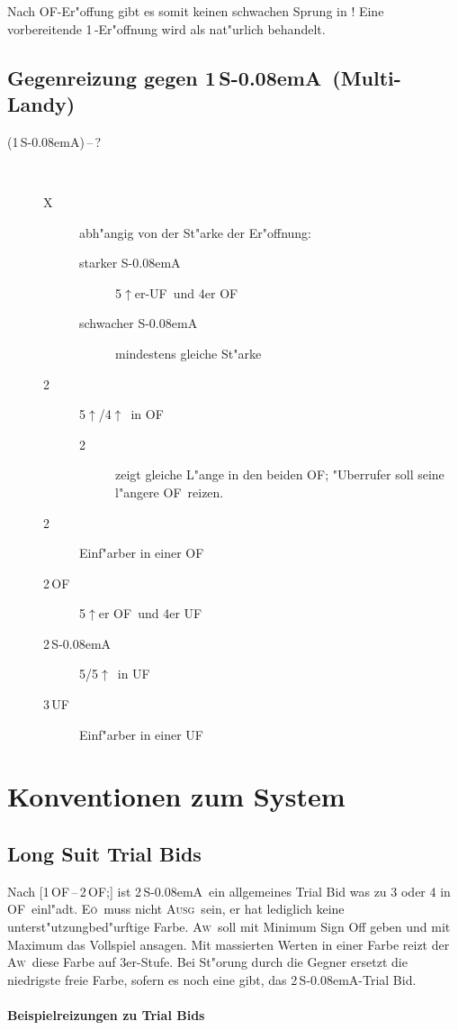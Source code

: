 \documentclass[11pt,german,twocolumn]{scrartcl}
\def\kar{\nobreak\,\Di}
\def\tre{\nobreak\,\Cl}
\def\tr{\Cl}
\def\pl{$\uparrow$}
\def\uf{\nobreak\textsf{\,UF}}
\def\of{\nobreak\textsf{\,OF}}
\def\ufa{\nobreak\textsf{UF}}
\def\ofa{\nobreak\textsf{OF}}
\def\sa{\nobreak\textsf{S\kern-0.08emA}}
\def\SA{\nobreak\,\sa}
\def\kontra{\textsf{X}}
\def\sep{\nobreak\,--\,}
\def\bal{\textsc{Ausg}}
\def\aw{\textsc{Aw}}
\def\eo{\textsc{E\"o}}
\def\bdsc{\begin{description}}
\def\edsc{\end{description}}
\newcommand{\Index}[1]{#1\index{#1}}
\begin{document}
Nach \ofa-Er"offung gibt es somit keinen schwachen Sprung in \tr! Eine
vorbereitende 1\tre-Er"offnung wird als nat"urlich behandelt.

\subsection{Gegenreizung gegen 1\SA\ (\Index{Multi-Landy})}

\bdsc
\item[(1\SA)\sep?] ~
 \bdsc
 \item[\kontra] abh"angig von der St"arke der Er"offnung:
   \bdsc 
     \item[starker \sa] 5\pl{}er-\ufa\ und 4er \ofa
     \item[schwacher \sa] mindestens gleiche St"arke
   \edsc
 \item[2\tre] 5\pl/4\pl\ in \ofa
  \bdsc
  \item[2\kar] zeigt gleiche L"ange in den beiden \ofa; "Uberrufer soll
    seine l"angere \ofa\ reizen.
  \edsc
 \item[2\kar] Einf"arber in einer \ofa
 \item[2\of] 5\pl{}er \ofa\ und 4er \ufa
 \item[2\SA] 5/5\pl\ in \ufa
 \item[3\uf] Einf"arber in einer \ufa
 \edsc
\edsc

\section{Konventionen zum System}

\subsection{Long Suit Trial Bids}

Nach [1\of\sep2\of;] ist 2\SA\ ein allgemeines Trial Bid was zu 3 oder 4 in
\ofa\ einl"adt. \eo\ muss nicht \bal\ sein, er hat lediglich keine
unterst"utzungbed"urftige Farbe. \aw\ soll mit Minimum Sign Off geben und mit
Maximum das Vollspiel ansagen. Mit massierten Werten in einer Farbe reizt der
\aw\ diese Farbe auf 3er-Stufe. Bei St"orung durch die Gegner ersetzt die
niedrigste freie Farbe, sofern es noch eine gibt, das 2\SA-Trial Bid.

\paragraph{Beispielreizungen zu Trial Bids} ~
\end{document}
